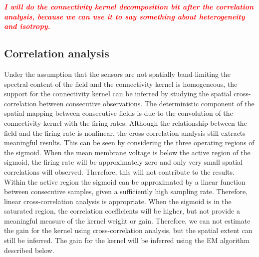 \documentclass[]{article}
\newcommand{\dean}[1]{\textsf{\emph{\textbf{\textcolor{red}{#1}}}}}
\begin{document}
\dean{I will do the connectivity kernel decomposition bit after the correlation analysis, because we can use it to say something about heterogeneity and isotropy.}

\subsection{Correlation analysis}\label{subsec:CorrAnal}
Under the assumption that the sensors are not spatially band-limiting the spectral content of the field and the connectivity kernel is homogeneous, the support for the connectivity kernel can be inferred by studying the spatial cross-correlation between consecutive observations. The deterministic component of the spatial mapping between consecutive fields is due to the convolution of the connectivity kernel with the firing rates. Although the relationship between the field and the firing rate is nonlinear, the cross-correlation analysis still extracts meaningful results. This can be seen by considering the three operating regions of the sigmoid. When the mean membrane voltage is below the active region of the sigmoid, the firing rate will be approximately zero and only very small spatial correlations will observed. Therefore, this will not contribute to the results. Within the active region the sigmoid can be approximated by a linear function between consecutive samples, given a sufficiently high sampling rate. Therefore, linear cross-correlation analysis is appropriate. When the sigmoid is in the saturated region, the correlation coefficients will be higher, but not provide a meaningful measure of the kernel weight or gain. Therefore, we can not estimate the gain for the kernel using cross-correlation analysis, but the spatial extent can still be inferred. The gain for the kernel will be inferred using the EM algorithm described below.
\end{document}
